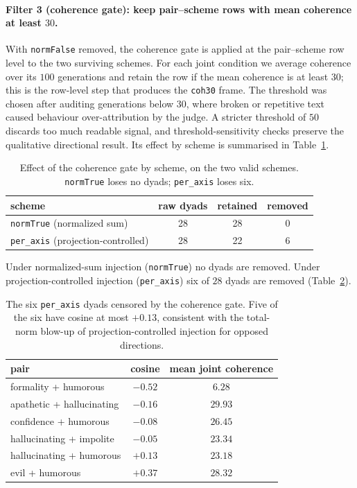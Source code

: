 \paragraph{Filter 3 (coherence gate): keep pair--scheme rows with mean coherence
at least $30$.}
With \texttt{normFalse} removed, the coherence gate is applied at the
pair--scheme row level to the two surviving schemes. For each joint condition we
average coherence over its $100$ generations and retain the row if the mean
coherence is at least $30$; this is the row-level step that produces the
\texttt{coh30} frame. The threshold was chosen after auditing generations below
$30$, where broken or repetitive text caused behaviour over-attribution by the
judge. A stricter threshold of $50$ discards too much readable signal, and
threshold-sensitivity checks preserve the qualitative directional result. Its
effect by scheme is summarised in Table~\ref{tab:coh-gate-counts}.

\begin{table}[h]
  \centering
  \small
  \begin{tabular}{lccc}
    \toprule
    scheme & raw dyads & retained & removed \\
    \midrule
    \texttt{normTrue} (normalized sum)         & 28 & 28 & 0 \\
    \texttt{per\_axis} (projection-controlled) & 28 & 22 & 6 \\
    \bottomrule
  \end{tabular}
  \caption{Effect of the coherence gate by scheme, on the two valid schemes.
  \texttt{normTrue} loses no dyads; \texttt{per\_axis} loses six.}
  \label{tab:coh-gate-counts}
\end{table}

Under normalized-sum injection (\texttt{normTrue}) no dyads are removed. Under
projection-controlled injection (\texttt{per\_axis}) six of $28$ dyads are
removed (Table~\ref{tab:coh-gate-censored}).

\begin{table}[h]
  \centering
  \small
  \begin{tabular}{lcc}
    \toprule
    pair & cosine & mean joint coherence \\
    \midrule
    formality + humorous       & $-0.52$ & $6.28$  \\
    apathetic + hallucinating  & $-0.16$ & $29.93$ \\
    confidence + humorous      & $-0.08$ & $26.45$ \\
    hallucinating + impolite   & $-0.05$ & $23.34$ \\
    hallucinating + humorous   & $+0.13$ & $23.18$ \\
    evil + humorous            & $+0.37$ & $28.32$ \\
    \bottomrule
  \end{tabular}
  \caption{The six \texttt{per\_axis} dyads censored by the coherence gate. Five
  of the six have cosine at most $+0.13$, consistent with the total-norm blow-up
  of projection-controlled injection for opposed directions.}
  \label{tab:coh-gate-censored}
\end{table}

